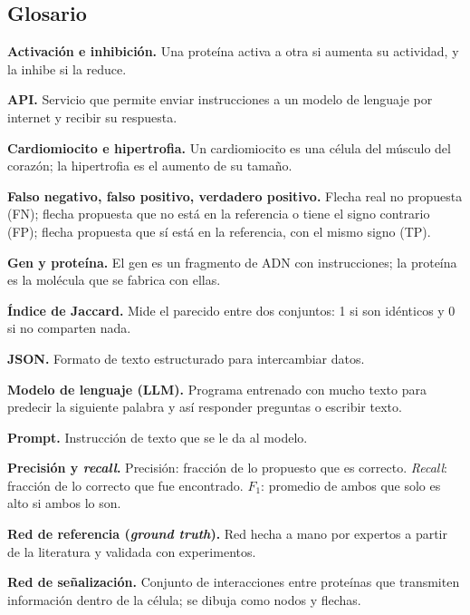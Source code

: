 \documentclass[unnumsec,webpdf,contemporary,large]{oup-authoring-template}
\begin{document}
\begin{appendices}

\section{Glosario}\label{app:glosario}

\begin{unlist}
\item \textbf{Activación e inhibición.} Una proteína activa a otra si aumenta su actividad, y la inhibe si la reduce.
\item \textbf{API.} Servicio que permite enviar instrucciones a un modelo de lenguaje por internet y recibir su respuesta.
\item \textbf{Cardiomiocito e hipertrofia.} Un cardiomiocito es una célula del músculo del corazón; la hipertrofia es el aumento de su tamaño.
\item \textbf{Falso negativo, falso positivo, verdadero positivo.} Flecha real no propuesta (FN); flecha propuesta que no está en la referencia o tiene el signo contrario (FP); flecha propuesta que sí está en la referencia, con el mismo signo (TP).
\item \textbf{Gen y proteína.} El gen es un fragmento de ADN con instrucciones; la proteína es la molécula que se fabrica con ellas.
\item \textbf{Índice de Jaccard.} Mide el parecido entre dos conjuntos: 1 si son idénticos y 0 si no comparten nada.
\item \textbf{JSON.} Formato de texto estructurado para intercambiar datos.
\item \textbf{Modelo de lenguaje (LLM).} Programa entrenado con mucho texto para predecir la siguiente palabra y así responder preguntas o escribir texto.
\item \textbf{Prompt.} Instrucción de texto que se le da al modelo.
\item \textbf{Precisión y \emph{recall}.} Precisión: fracción de lo propuesto que es correcto. \emph{Recall}: fracción de lo correcto que fue encontrado. $F_1$: promedio de ambos que solo es alto si ambos lo son.
\item \textbf{Red de referencia (\emph{ground truth}).} Red hecha a mano por expertos a partir de la literatura y validada con experimentos.
\item \textbf{Red de señalización.} Conjunto de interacciones entre proteínas que transmiten información dentro de la célula; se dibuja como nodos y flechas.

\end{unlist}
\end{appendices}
\end{document}
